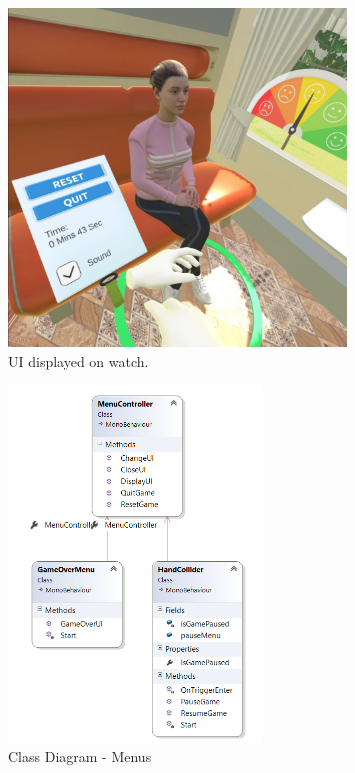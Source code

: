 \begin{figure}[h!]
	\caption{UI displayed on watch.}
	\label{image:PauseMenu}
	\centering
	\includegraphics[width=0.8\textwidth]{Images/Interaction2.jpg}
\end{figure}

\begin{figure}[h!]
	\caption{Class Diagram - Menus}
	\label{image:Menus}
	\centering
	\includegraphics[width=0.6\textwidth]{Images/ClassDiagram Menus.png}
\end{figure}

